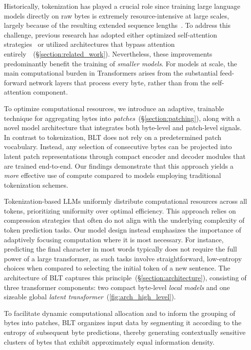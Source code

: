 Historically, tokenization has played a crucial role since training large language models directly on raw bytes is extremely resource-intensive at large scales, largely because of the resulting extended sequence lengths~\citep{xue2022byt5}. To address this challenge, previous research has adopted either optimized self-attention strategies~\citep{el2020characterbert, clark2022canine} or utilized architectures that bypass attention entirely~\citep{wang2024mambabyte}~(\S\ref{section:related_work}). Nevertheless, these improvements predominantly benefit the training of \textit{smaller models}. For models at scale, the main computational burden in Transformers arises from the substantial feed-forward network layers that process every byte, rather than from the self-attention component.

To optimize computational resources, we introduce an adaptive, trainable technique for aggregating bytes into \textit{patches}~(\S\ref{section:patching}), along with a novel model architecture that integrates both byte-level and patch-level signals. In contrast to tokenization, {\textsc BLT} does not rely on a predetermined patch vocabulary. Instead, any selection of consecutive bytes can be projected into latent patch representations through compact encoder and decoder modules that are trained end-to-end. Our findings demonstrate that this approach yields a \textit{more} effective use of compute compared to models employing traditional tokenization schemes.

Tokenization-based LLMs uniformly distribute computational resources across all tokens, prioritizing uniformity over optimal efficiency. This approach relies on compression strategies that often do not align with the underlying complexity of token prediction tasks. Our model design instead emphasizes the importance of adaptively focusing computation where it is most necessary. For instance, predicting the final character in most words typically does not require the full power of a large transformer, as such tasks involve straightforward, low-entropy choices when compared to selecting the initial token of a new sentence. The architecture of {\textsc BLT} captures this principle~(\S\ref{section:architecture}), consisting of three transformer components: two compact byte-level \textit{local models} and one sizeable global \textit{latent transformer}~(\autoref{fig:arch_high_level}).

To facilitate dynamic computational allocation and to inform the grouping of bytes into patches, {\textsc BLT} organizes input data by segmenting it according to the entropy of subsequent byte predictions, thereby generating contextually sensitive clusters of bytes that exhibit approximately equal information density.

